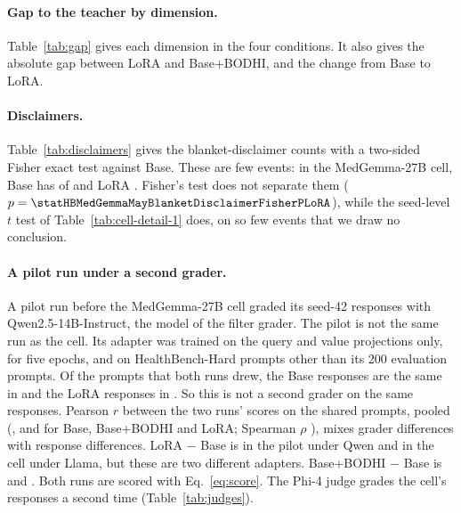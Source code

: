 \documentclass{article}
\newcommand{\bodhi}{BODHI}
\newcommand{\hbhard}{HealthBench-Hard}
\begin{document}
\paragraph{Gap to the teacher by dimension.} Table~\ref{tab:gap} gives each dimension in the four
conditions. It also gives the absolute gap between LoRA and Base+\bodhi{}, and the change from
Base to LoRA.

\begin{table}[!ht]
\centering
\small
\caption{Mean of each dimension in the four conditions (mean of seed means). The table also gives
the absolute gap between LoRA and Base+\bodhi{} and the change from Base to LoRA. Active inquiry
and appropriate hedging are proportions. The other dimensions are means on the 0--2 scale.}
\label{tab:gap}
\footnotesize
\setlength{\tabcolsep}{3pt}

\end{table}

\paragraph{Disclaimers.} Table~\ref{tab:disclaimers} gives the blanket-disclaimer counts with a
two-sided Fisher exact test against Base. These are few events: in the MedGemma-27B cell, Base has
\statHBMedGemmaMayBlanketDisclaimerCountBase{} of \statHBMedGemmaMayBlanketDisclaimerNBase{} and LoRA
\statHBMedGemmaMayBlanketDisclaimerCountLoRA. Fisher's test does not separate them
($p = \statHBMedGemmaMayBlanketDisclaimerFisherPLoRA$), while the seed-level $t$ test of
Table~\ref{tab:cell-detail-1} does, on so few events that we draw no conclusion.

\paragraph{A pilot run under a second grader.} A pilot run before the MedGemma-27B cell graded its
seed-42 responses with Qwen2.5-14B-Instruct, the model of the filter grader. The pilot is not the same
run as the cell. Its adapter was trained on the query and value projections only, for five epochs, and
on \hbhard{} prompts other than its 200 evaluation prompts. Of the \statPilotGraderShared{} prompts that
both runs drew, the Base responses are the same in \statPilotGraderSameReplyBase{} and the LoRA responses
in \statPilotGraderSameReplyLoRA. So this is not a second grader on the same responses. Pearson $r$
between the two runs' scores on the shared prompts, \statPilotGraderRPooled{} pooled
(\statPilotGraderRBase, \statPilotGraderRBaseBodhi{} and \statPilotGraderRLoRA{} for Base,
Base+\bodhi{} and LoRA; Spearman $\rho$ \statPilotGraderRhoPooled), mixes grader differences with
response differences. LoRA $-$ Base is \statPilotGraderLoRAMinusBaseFirst{} in the pilot under Qwen and
\statPilotGraderLoRAMinusBaseSecond{} in the cell under Llama, but these are two different adapters.
Base+\bodhi{} $-$ Base is \statPilotGraderBaseBodhiMinusBaseFirst{} and
\statPilotGraderBaseBodhiMinusBaseSecond. Both runs are scored with Eq.~\ref{eq:score}. The Phi-4
judge grades the cell's responses a second time (Table~\ref{tab:judges}).
\end{document}
